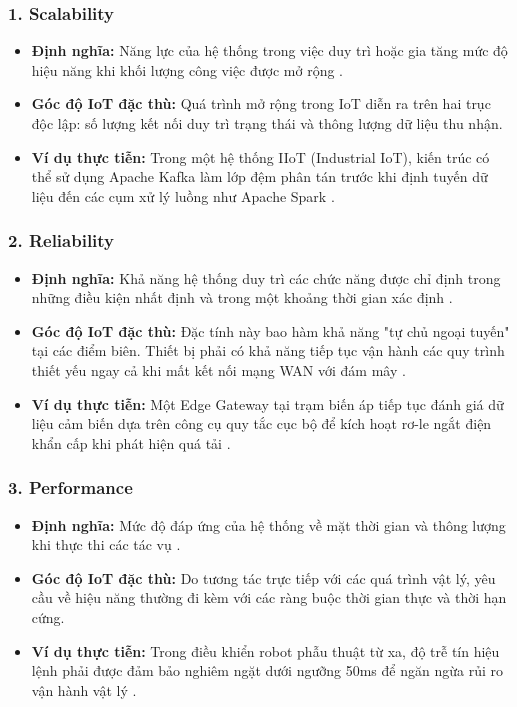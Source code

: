 \subsubsection*{1. Scalability}
\begin{itemize}
    \item \textbf{Định nghĩa:} Năng lực của hệ thống trong việc duy trì hoặc gia tăng mức độ hiệu năng khi khối lượng công việc được mở rộng \cite{richards2020}.
    \item \textbf{Góc độ IoT đặc thù:} Quá trình mở rộng trong IoT diễn ra trên hai trục độc lập: số lượng kết nối duy trì trạng thái và thông lượng dữ liệu thu nhận.
    \item \textbf{Ví dụ thực tiễn:} Trong một hệ thống IIoT (Industrial IoT), kiến trúc có thể sử dụng Apache Kafka làm lớp đệm phân tán trước khi định tuyến dữ liệu đến các cụm xử lý luồng như Apache Spark \cite{databricks_johndeere}.
\end{itemize}

\subsubsection*{2. Reliability}
\begin{itemize}
    \item \textbf{Định nghĩa:} Khả năng hệ thống duy trì các chức năng được chỉ định trong những điều kiện nhất định và trong một khoảng thời gian xác định \cite{richards2020}.
    \item \textbf{Góc độ IoT đặc thù:} Đặc tính này bao hàm khả năng "tự chủ ngoại tuyến" tại các điểm biên. Thiết bị phải có khả năng tiếp tục vận hành các quy trình thiết yếu ngay cả khi mất kết nối mạng WAN với đám mây \cite{lea2018}.
    \item \textbf{Ví dụ thực tiễn:} Một Edge Gateway tại trạm biến áp tiếp tục đánh giá dữ liệu cảm biến dựa trên công cụ quy tắc cục bộ để kích hoạt rơ-le ngắt điện khẩn cấp khi phát hiện quá tải \cite{lea2018}.
\end{itemize}

\subsubsection*{3. Performance}
\begin{itemize}
    \item \textbf{Định nghĩa:} Mức độ đáp ứng của hệ thống về mặt thời gian và thông lượng khi thực thi các tác vụ \cite{richards2020}.
    \item \textbf{Góc độ IoT đặc thù:} Do tương tác trực tiếp với các quá trình vật lý, yêu cầu về hiệu năng thường đi kèm với các ràng buộc thời gian thực và thời hạn cứng.
    \item \textbf{Ví dụ thực tiễn:} Trong điều khiển robot phẫu thuật từ xa, độ trễ tín hiệu lệnh phải được đảm bảo nghiêm ngặt dưới ngưỡng 50ms để ngăn ngừa rủi ro vận hành vật lý \cite{lea2018}.
\end{itemize}


